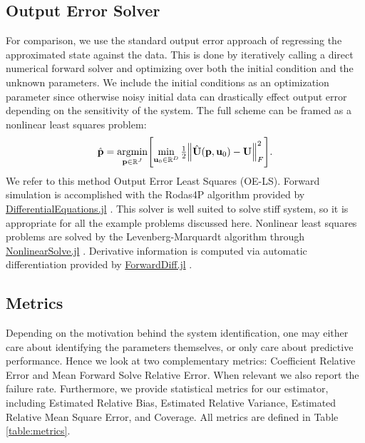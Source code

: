 \subsection{Output Error Solver} \label{sec:fslsq}
For comparison, we use the standard output error approach of regressing the approximated state against the data. This is done by iteratively calling a direct numerical forward solver and optimizing over both the initial condition and the unknown parameters. We include the initial conditions as an optimization parameter since otherwise noisy initial data can drastically effect output error depending on the sensitivity of the system. The full scheme  can be framed as a nonlinear least squares problem:
\begin{equation}
	\label{eq:fslsq}
	\hat{\mathbf{p}} = \underset{\mathbf{p} \in \mathbb{R}^J }{\operatorname{argmin}} \Biggl[ \min_{\mathbf{u}_0 \in \mathbb{R}^D} \tfrac{1}{2} \Bigl\| \hat{\mathbf{U}}(\mathbf{p}, \mathbf{u}_0) - \mathbf{U}\Bigr\|^2_F \Biggr].
\end{equation}
We refer to this method Output Error Least Squares (OE-LS). Forward simulation is accomplished with the Rodas4P algorithm provided by \href{https://docs.sciml.ai/DiffEqDocs/stable/}{DifferentialEquations.jl} \citep{RackauckasNie2017JORS}. This solver is well suited to solve stiff system, so it is appropriate for all the example problems discussed here. Nonlinear least squares problems are solved by the Levenberg-Marquardt algorithm through \href{https://docs.sciml.ai/NonlinearSolve/stable/}{NonlinearSolve.jl} \citep{PalHoltorfLarssonEtAl2024arXiv240316341}. Derivative information is computed via automatic differentiation provided by \href{https://github.com/JuliaDiff/ForwardDiff.jl}{ForwardDiff.jl} \citep{RevelsLubinPapamarkou2016arXiv160707892}.

\subsection{Metrics} \label{sec:metrics}
Depending on the motivation behind the system identification, one may either care about identifying the parameters themselves, or only care about predictive performance. Hence we look at two complementary metrics: Coefficient Relative Error and Mean Forward Solve Relative Error. When relevant we also report the failure rate. Furthermore, we provide statistical metrics for our estimator, including Estimated Relative Bias, Estimated Relative Variance, Estimated Relative Mean Square Error, and Coverage. All metrics are defined in Table \ref{table:metrics}.

